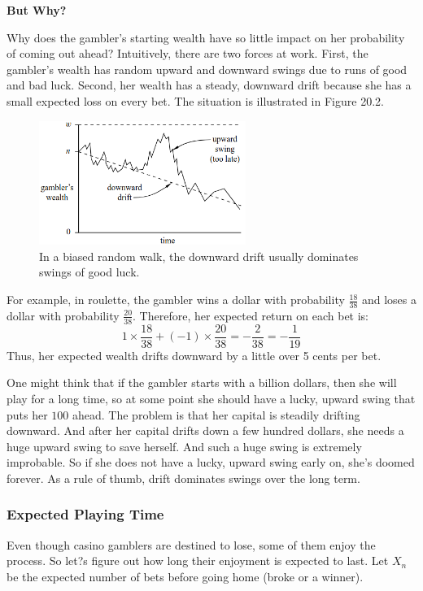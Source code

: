 \documentclass[12pt,a4paper]{article}
\begin{document}
		\textbf{But Why?}
		
		Why does the gambler's starting wealth have so little impact on her probability of coming out ahead? Intuitively, there are two forces at work. First, the gambler's wealth has random upward and downward swings due to runs of good and bad luck. Second, her wealth has a steady, downward drift because she has a small expected loss on every bet. The situation is illustrated in Figure 20.2.
		
		\begin{figure}[h]
			\centering
			\includegraphics[width=0.6\textwidth]{images/drift_swing.png} 
			\caption{In a biased random walk, the downward drift usually dominates swings of good luck.}
		\end{figure}
		
		For example, in roulette, the gambler wins a dollar with probability $\frac{18}{38}$ and loses a dollar with probability $\frac{20}{38}$. Therefore, her expected return on each bet is:
		$$
		1 \times \frac{18}{38} + (-1) \times \frac{20}{38} = -\frac{2}{38} = -\frac{1}{19}
		$$
		Thus, her expected wealth drifts downward by a little over 5 cents per bet.
		
		One might think that if the gambler starts with a billion dollars, then she will play for a long time, so at some point she should have a lucky, upward swing that puts her $100$ ahead. The problem is that her capital is steadily drifting downward. And after her capital drifts down a few hundred dollars, she needs a huge upward swing to save herself. And such a huge swing is extremely improbable. So if she does not have a lucky, upward swing early on, she's doomed forever. As a rule of thumb, drift dominates swings over the long term.
		
	
	
	\subsubsection{ Expected Playing Time}
	
	Even though casino gamblers are destined to lose, some of them enjoy the process. So let?s figure out how long their enjoyment is expected to last. Let \( X_n \) be the expected number of bets before going home (broke or a winner).
	
\end{document}
